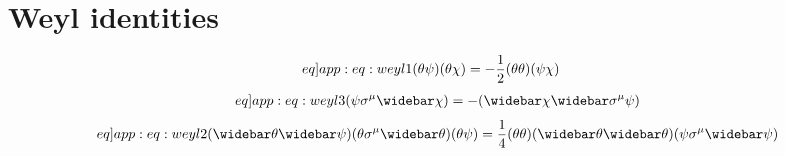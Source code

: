 \documentclass[english, notitlepage]{article}
\begin{document}
            \appendix
\section{Weyl identities}
    \begin{align}
        \label[eq]{app:eq:weyl1}
        (\theta\psi)(\theta\chi) & = -\frac{1}{2} (\theta\theta) (\psi\chi)
    \end{align}
    \begin{align}
        \label[eq]{app:eq:weyl3}
        (\psi \sigma^\mu \wbar\chi) = -(\wbar\chi \wbar\sigma^\mu \psi)
    \end{align}
    \begin{align}
        \label[eq]{app:eq:weyl2}
        (\wbar\theta\wbar\psi) (\theta\sigma^\mu\wbar\theta) (\theta\psi) = \frac{1}{4} (\theta\theta) (\wbar\theta\wbar\theta) (\psi\sigma^\mu\wbar\psi)
    \end{align}
\end{document}
